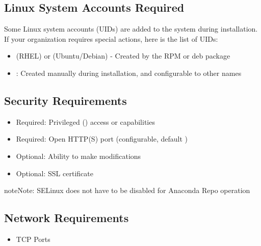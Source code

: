 \documentclass[letterpaper,10pt,openany,oneside]{sphinxmanual}
\begin{document}
\subsection{Linux System Accounts Required}
\label{AnacondaRepository:linux-system-accounts-required}
Some Linux system accounts (UIDs) are added to the system during installation.
If your organization requires special actions, here is the list of UIDs:
\begin{itemize}
\item {} 
 (RHEL) or  (Ubuntu/Debian) - Created by the RPM or deb package

\item {} 
: Created manually during installation, and configurable to other names

\end{itemize}


\subsection{Security Requirements}
\label{AnacondaRepository:security-requirements}\begin{itemize}
\item {} 
Required: Privileged () access or  capabilities

\item {} 
Required: Open HTTP(S) port (configurable, default )

\item {} 
Optional: Ability to make  modifications

\item {} 
Optional: SSL certificate

\end{itemize}

\begin{notice}{note}{Note:}
SELinux does not have to be disabled for Anaconda Repo operation
\end{notice}


\subsection{Network Requirements}
\label{AnacondaRepository:network-requirements}\begin{itemize}
\item {} 
TCP Ports

\end{itemize}
\end{document}
